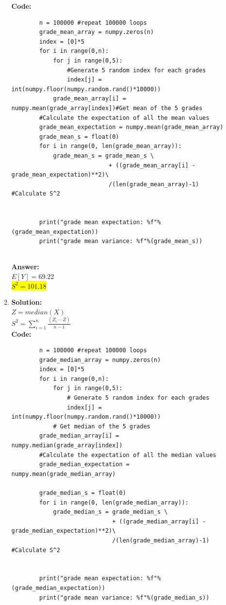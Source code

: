 \documentclass{article}
\newcommand{\myansw}{\textbf{Answer:}\\}
\newcommand{\mysolu}{\textbf{Solution:}\\}
\begin{document}
\begin{enumerate}
\begin{enumerate}
		\textbf{Code:}\\
		\begin{verbatim}
		n = 100000 #repeat 100000 loops
		grade_mean_array = numpy.zeros(n)
		index = [0]*5
		for i in range(0,n):
		    for j in range(0,5):
		        #Generate 5 random index for each grades
		        index[j] = int(numpy.floor(numpy.random.rand()*10000))
		    grade_mean_array[i] = numpy.mean(grade_array[index])#Get mean of the 5 grades
		#Calculate the expectation of all the mean values
		grade_mean_expectation = numpy.mean(grade_mean_array)
		grade_mean_s = float(0)
		for i in range(0, len(grade_mean_array)):
		    grade_mean_s = grade_mean_s \
		                    + ((grade_mean_array[i] - grade_mean_expectation)**2)\
			                /(len(grade_mean_array)-1) #Calculate S^2 


		print("grade mean expectation: %f"%(grade_mean_expectation))
		print("grade mean variance: %f"%(grade_mean_s))	
		

		\end{verbatim}

		\myansw
		$E[Y] = 69.22$\\
		\colorbox{yellow}{$S^2=101.18$}\\
		\item
		\mysolu
		$Z = median(X)$\\
		$S^2 = \sum\limits_{i = 1}^{n}\frac{(Z_i - \overline{Z})}{n-1}$\\
		
		\textbf{Code:}\\
		\begin{verbatim}
		n = 100000 #repeat 100000 loops
		grade_median_array = numpy.zeros(n)
		index = [0]*5
		for i in range(0,n):
		    for j in range(0,5):
		        # Generate 5 random index for each grades
		        index[j] = int(numpy.floor(numpy.random.rand()*10000))
		    # Get median of the 5 grades
		grade_median_array[i] = numpy.median(grade_array[index])
		#Calculate the expectation of all the median values
		grade_median_expectation = numpy.mean(grade_median_array)

		grade_median_s = float(0)
		for i in range(0, len(grade_median_array)):
		    grade_median_s = grade_median_s \
		                     + ((grade_median_array[i] - grade_median_expectation)**2)\
		                     /(len(grade_median_array)-1) #Calculate S^2


		print("grade mean expectation: %f"%(grade_median_expectation))
		print("grade mean variance: %f"%(grade_median_s))
		

\end{verbatim}
\end{enumerate}
\end{enumerate}
\end{document}
